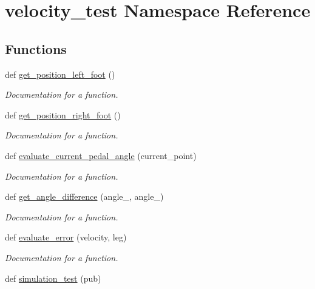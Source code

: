\hypertarget{namespacevelocity__test}{}\section{velocity\+\_\+test Namespace Reference}
\label{namespacevelocity__test}
\subsection*{Functions}
\begin{DoxyCompactItemize}
\item 
def \mbox{\hyperlink{namespacevelocity__test_a21f5b452c3d9983c2f021bf29f1b0381}{get\+\_\+position\+\_\+left\+\_\+foot}} ()
\begin{DoxyCompactList}\small\item\em Documentation for a function. \end{DoxyCompactList}\item 
def \mbox{\hyperlink{namespacevelocity__test_a07bc7929e83ff9cb68e0172f7dbd84f3}{get\+\_\+position\+\_\+right\+\_\+foot}} ()
\begin{DoxyCompactList}\small\item\em Documentation for a function. \end{DoxyCompactList}\item 
def \mbox{\hyperlink{namespacevelocity__test_aa18f2ff9b77912b35fd8eb15408d564d}{evaluate\+\_\+current\+\_\+pedal\+\_\+angle}} (current\+\_\+point)
\begin{DoxyCompactList}\small\item\em Documentation for a function. \end{DoxyCompactList}\item 
def \mbox{\hyperlink{namespacevelocity__test_a3b7c195a552b65290f4344865f48948e}{get\+\_\+angle\+\_\+difference}} (angle\+\_, angle\+\_)
\begin{DoxyCompactList}\small\item\em Documentation for a function. \end{DoxyCompactList}\item 
def \mbox{\hyperlink{namespacevelocity__test_a39ca1f32ae8d0b7035cb207c50722da0}{evaluate\+\_\+error}} (velocity, leg)
\begin{DoxyCompactList}\small\item\em Documentation for a function. \end{DoxyCompactList}\item 
def \mbox{\hyperlink{namespacevelocity__test_a3abe39643659ed5bf979398a5b0cec6d}{simulation\+\_\+test}} (pub)

\end{DoxyCompactItemize}
